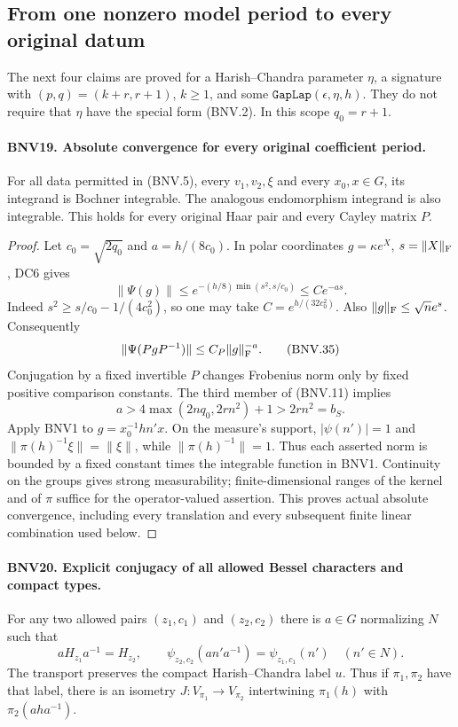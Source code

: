 \subsection{From one nonzero model period to every original datum}

The next four claims are proved for a Harish--Chandra parameter $\eta$,
a signature with $(p,q)=(k+r,r+1)$, $k\ge1$, and some
$\texttt{GapLap}(\epsilon,\eta,h)$.  They do not require that $\eta$
have the special form (BNV.2).  In this scope $q_0=r+1$.

\paragraph{BNV19. Absolute convergence for every original coefficient period.}
\label{claim:BNV19}
For all data permitted in (BNV.5), every $v_1,v_2,\xi$ and every
$x_0,x\in G$, its integrand is Bochner integrable.  The analogous
endomorphism integrand is also integrable.  This holds for every original
Haar pair and every Cayley matrix $P$.

\begin{proof}
Let $c_0=\sqrt{2q_0}$ and $a=h/(8c_0)$.  In polar coordinates
$g=\kappa e^X$, $s=\|X\|_{\rm F}$, DC6 gives
\[
 \|\Psi(g)\|\le e^{-(h/8)\min(s^2,s/c_0)}
                 \le C e^{-as}.
\]
Indeed $s^2\ge s/c_0-1/(4c_0^2)$, so one may take
$C=e^{h/(32c_0^2)}$.  Also $\|g\|_{\rm F}\le\sqrt n e^s$.
Consequently
\[
 \|\Psi(PgP^{-1})\|\le C_P\|g\|_{\rm F}^{-a}.
 \tag{BNV.35}
\]
Conjugation by a fixed invertible $P$ changes Frobenius norm only by
fixed positive comparison constants.  The third member of (BNV.11)
implies
\[
 a>4\max(2nq_0,2rn^2)+1>2rn^2=b_S.
\]
Apply BNV1 to $g=x_0^{-1}hn'x$.  On the measure's support,
$|\psi(n')|=1$ and $\|\pi(h)^{-1}\xi\|=\|\xi\|$, while
$\|\pi(h)^{-1}\|=1$.  Thus each asserted norm is bounded by a fixed
constant times the integrable function in BNV1.  Continuity on the
groups gives strong measurability; finite-dimensional ranges of the
kernel and of $\pi$ suffice for the operator-valued assertion.
This proves actual absolute convergence, including every translation
and every subsequent finite linear combination used below.
\end{proof}

\paragraph{BNV20. Explicit conjugacy of all allowed Bessel characters and compact types.}
\label{claim:BNV20}
For any two allowed pairs $(z_1,c_1)$ and $(z_2,c_2)$ there is
$a\in G$ normalizing $N$ such that
\[
 aH_{z_1}a^{-1}=H_{z_2},\qquad
 \psi_{z_2,c_2}(an'a^{-1})=\psi_{z_1,c_1}(n')\quad(n'\in N).
 \tag{BNV.36}
\]
The transport preserves the compact Harish--Chandra label $u$.
Thus if $\pi_1,\pi_2$ have that label, there is an isometry
$J:V_{\pi_1}\to V_{\pi_2}$ intertwining
$\pi_1(h)$ with $\pi_2(aha^{-1})$.

